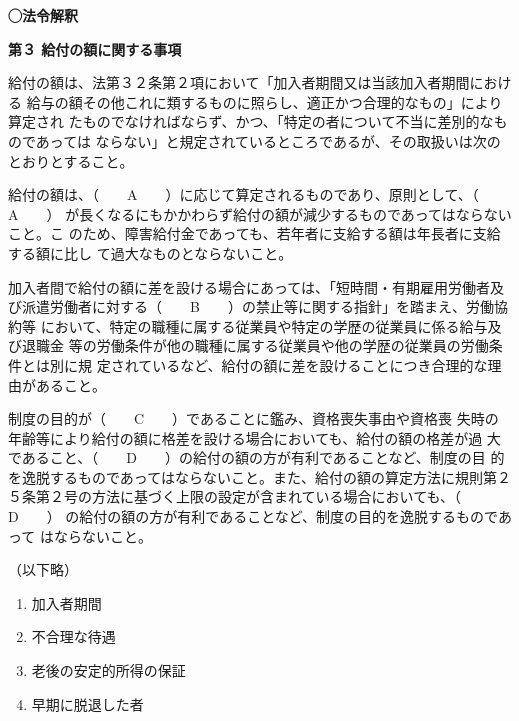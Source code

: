 \begin{fillblank}[年金1 2025 問題1(1)]
  \noindent \textbf{◯法令解釈}
  \begin{lawstructure}
    \begin{lawarticle}{}{}
      \noindent \textbf{第３ 給付の額に関する事項}

      給付の額は、法第３２条第２項において「加入者期間又は当該加入者期間における
      給与の額その他これに類するものに照らし、適正かつ合理的なもの」により算定され
      たものでなければならず、かつ、「特定の者について不当に差別的なものであっては
      ならない」と規定されているところであるが、その取扱いは次のとおりとすること。

給付の額は、（　　A　　）に応じて算定されるものであり、原則として、（　　A　　）
が長くなるにもかかわらず給付の額が減少するものであってはならないこと。こ
のため、障害給付金であっても、若年者に支給する額は年長者に支給する額に比し
て過大なものとならないこと。


加入者間で給付の額に差を設ける場合にあっては、「短時間・有期雇用労働者及
び派遣労働者に対する（　　B　　）の禁止等に関する指針」を踏まえ、労働協約等
において、特定の職種に属する従業員や特定の学歴の従業員に係る給与及び退職金
等の労働条件が他の職種に属する従業員や他の学歴の従業員の労働条件とは別に規
定されているなど、給付の額に差を設けることにつき合理的な理由があること。

制度の目的が（　　C　　）であることに鑑み、資格喪失事由や資格喪
失時の年齢等により給付の額に格差を設ける場合においても、給付の額の格差が過
大であること、（　　D　　）の給付の額の方が有利であることなど、制度の目
的を逸脱するものであってはならないこと。また、給付の額の算定方法に規則第２
５条第２号の方法に基づく上限の設定が含まれている場合においても、（　　D　　）
の給付の額の方が有利であることなど、制度の目的を逸脱するものであって
はならないこと。

      （以下略）

    \end{lawarticle}
  \end{lawstructure}  
\end{fillblank}

\begin{answerbox}
  \begin{enumerate}
    \item 加入者期間
    \item 不合理な待遇
    \item 老後の安定的所得の保証
    \item 早期に脱退した者
  \end{enumerate}
\end{answerbox}

